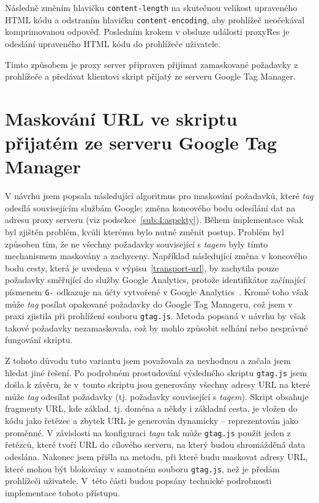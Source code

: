 Následně změním hlavičku \texttt{content-length} na skutečnou velikost upraveného HTML kódu a odstraním hlavičku \texttt{content-encoding}, aby prohlížeč neočekával komprimovanou odpověď. Posledním krokem v obsluze události proxyRes je odeslání upraveného HTML kódu do prohlížeče uživatele. 

Tímto způsobem je proxy server připraven přijímat zamaskované požadavky z prohlížeče a předávat klientovi skript přijatý ze serveru Google Tag Manager.
\bigskip


\section{Maskování URL ve skriptu přijatém ze serveru Google Tag Manager}
\label{sec:5:mask}

V návrhu jsem popsala následující algoritmus pro maskování požadavků, které {\it tag} odesílá souvisejícím službám Google: změna koncového bodu odesílání dat na adresu proxy serveru (viz podsekce~\ref{sub:4:aspekty}). Během implementace však byl zjištěn problém, kvůli kterému bylo nutné změnit postup. Problém byl způsoben tím, že ne všechny požadavky související s {\it tagem} byly tímto mechanismem maskovány a zachyceny. Například následující změna v koncového bodu cesty, která je uvedena v výpisu~\ref{transport-url}, by zachytila pouze požadavky směřující do služby Google Analytics, protože identifikátor začínající písmenem \texttt{G-} odkazuje na účty vytvořené v Google Analytics~\cite{idGoogle}. Kromě toho však může {\it tag} posílat opakované požadavky do Google Tag Manageru, což jsem v praxi zjistila při prohlížení souboru \texttt{gtag.js}. Metoda popsaná v návrhu by však takové požadavky nezamaskovala, což by mohlo způsobit selhání nebo nesprávné fungování skriptu.

Z tohoto důvodu tuto variantu jsem považovala za nevhodnou a začala jsem hledat jiné řešení. Po podrobném prostudování výsledného skriptu \texttt{gtag.js} jsem došla k závěru, že v~tomto skriptu jsou generovány všechny adresy URL na které může {\it tag} odesílat požadavky (tj. požadavky související s {\it tagem}). Skript obsahuje fragmenty URL, kde základ, tj. doména a někdy i základní cesta, je vložen do kódu jako řetězec a zbytek URL je generován dynamicky -- reprezentován jako proměnné. V závislosti na konfiguraci {\it tagu} tak může \texttt{gtag.js} použít jeden z řetězců, které tvoří URL do cílového serveru, na který budou shromážděná data odeslána. Nakonec jsem přišla na metodu, při které budu maskovat adresy URL, které mohou být blokovány v samotném souboru \texttt{gtag.js}, než je předám prohlížeči uživatele. V~této části budou popsány technické podrobnosti implementace tohoto přístupu.

